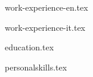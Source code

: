 \documentclass[english,a4paper]{europasscv}
\begin{document}
  \begin{europasscv}

  \ecvpersonalinfo

\begin{en}
\end{en}
    
\begin{it}
\end{it}

\begin{en}
    {work-experience-en.tex}
\end{en}

\begin{it}
    {work-experience-it.tex}
\end{it}
  
{education.tex}

{personalskills.tex}


\end{europasscv}
\end{document}
